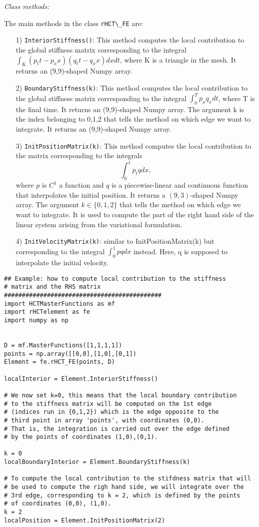 \documentclass{amsart}
\theoremstyle{plain}
\theoremstyle{definition}
\theoremstyle{remark}
\numberwithin{equation}{section}
\begin{document}
\textit{Class methods:}

The main methods in the class \verb|rHCT\_FE| are:
\begin{itemize}
\item[1)] \verb|InteriorStiffness()|: This method computes the local contribution to the global stiffness
matrix corresponding to the integral 
$\int_K(p_tt-p_xx)(q_tt-q_xx)dxdt$, 
where K is a triangle in the mesh. It returns an (9,9)-shaped Numpy array.

\item[2)] \verb|BoundaryStiffness(k)|: This method computes the local contribution to the global stiffness
matrix corresponding to the integral 
$\int_0^T p_x q_x dt$, 
where T is the final time. It returns an (9,9)-shaped Numpy array. The argument k is the
index belonging to {0,1,2} that tells the method on which edge we want to integrate.
It returns an (9,9)-shaped Numpy array.

\item[3)] \verb|InitPositionMatrix(k)|: This method computes the local contribution to the matrix corresponding to the integrals
$$\int_0^1 p_t q dx,$$
where $p$ is $C^1$ a function and $q$ is a piecewise-linear and continuous function that interpolates
the initial position.
It returns a $(9,3)$-shaped Numpy array. The argument $k\in\{0,1,2\}$
that tells the method on which edge we want to integrate. It is used to compute the part
of the right hand side of the linear system arising from the variational formulation.

\item[4)] \verb|InitVelocityMatrix(k)|: similar to InitPositionMatrix(k) but corresponding to the integral
$\int_0^1 p q dx$ instead. Here, q is supposed to interpolate the initial velocity. 
\end{itemize}

\begin{lstlisting} 
## Example: how to compute local contribution to the stiffness 
# matrix and the RHS matrix
############################################
import HCTMasterFunctions as mf
import rHCTelement as fe
import numpy as np


D = mf.MasterFunctions([1,1,1,1])
points = np.array([[0,0],[1,0],[0,1])
Element = fe.rHCT_FE(points, D)

localInterior = Element.InteriorStiffness()

# We now set k=0, this means that the local boundary contribution 
# to the stiffness matrix will be computed on the 1st edge 
# (indices run in {0,1,2}) which is the edge opposite to the
# third point in array 'points', with coordinates (0,0). 
# That is, the integration is carried out over the edge defined 
# by the points of coordinates (1,0),(0,1).

k = 0
localBoundaryInterior = Element.BoundaryStiffness(k)

# To compute the local contribution to the stifdness matrix that will
# be used to compute the righ hand side, we will integrate over the
# 3rd edge, corresponding to k = 2, which is defined by the points 
# of coordinates (0,0), (1,0).
k = 2
localPosition = Element.InitPositionMatrix(2)
\end{lstlisting} 
\end{document}
